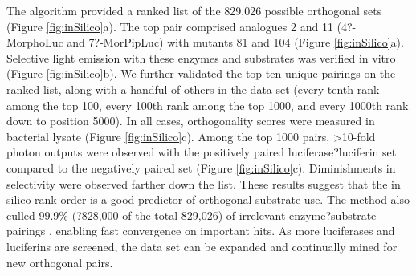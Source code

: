 \par
The algorithm provided a ranked list of the 829,026 possible orthogonal sets (Figure \ref{fig:inSilico}a). The top pair comprised analogues 2 and 11 (4?-MorphoLuc and 7?-MorPipLuc) with mutants 81 and 104 (Figure \ref{fig:inSilico}a). Selective light emission with these enzymes and substrates was verified in vitro (Figure \ref{fig:inSilico}b). We further validated the top ten unique pairings on the ranked list, along with a handful of others in the data set (every tenth rank among the top 100, every 100th rank among the top 1000, and every 1000th rank down to position 5000). In all cases, orthogonality scores were measured in bacterial lysate (Figure \ref{fig:inSilico}c). Among the top 1000 pairs, >10-fold photon outputs were observed with the positively paired luciferase?luciferin set compared to the negatively paired set (Figure \ref{fig:inSilico}c). Diminishments in selectivity were observed farther down the list. These results suggest that the in silico rank order is a good predictor of orthogonal substrate use. The method also culled 99.9\% (?828,000 of the total 829,026) of irrelevant enzyme?substrate pairings
, enabling fast convergence on important hits. As more luciferases and luciferins are screened, the data set can be expanded and continually mined for new orthogonal pairs.

